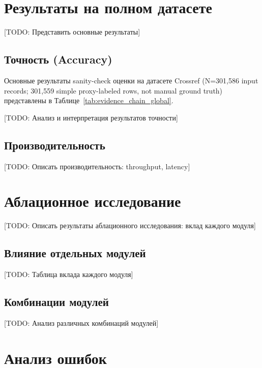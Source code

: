 \section{Результаты на полном датасете}
\label{sec:exp:results_full}

[TODO: Представить основные результаты]

\subsection{Точность (Accuracy)}
\label{subsec:exp:accuracy}

Основные результаты sanity-check оценки на датасете Crossref (N=301,586 input records; 301,559 simple proxy-labeled rows, not manual ground truth) представлены в Таблице~\ref{tab:evidence_chain_global}.



[TODO: Анализ и интерпретация результатов точности]

\subsection{Производительность}
\label{subsec:exp:performance}

[TODO: Описать производительность: throughput, latency]

\section{Аблационное исследование}
\label{sec:exp:ablation}

[TODO: Описать результаты аблационного исследования: вклад каждого модуля]

\subsection{Влияние отдельных модулей}
\label{subsec:exp:module_impact}

[TODO: Таблица вклада каждого модуля]

\subsection{Комбинации модулей}
\label{subsec:exp:combinations}

[TODO: Анализ различных комбинаций модулей]

\section{Анализ ошибок}
\label{sec:exp:error_analysis}

